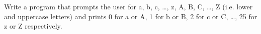 Write a program that prompts the user for a, b, c, \ldots, z, A, B, C, \ldots, Z (i.e. lower and uppercase letters) and prints 0 for a or A, 1 for b or B, 2 for c or C, \ldots, 25 for z or Z respectively.

